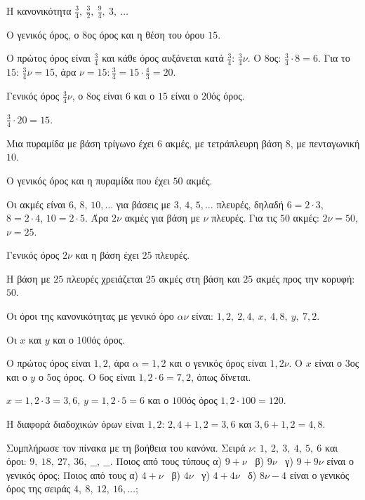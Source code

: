 \tixero Η κανονικότητα $\frac{3}{4},\ \frac{3}{2},\ \frac{9}{4},\ 3,\ \ldots$\par
\tithelo Ο γενικός όρος, ο $8$ος όρος και η θέση του όρου $15$.\par
\possindeo Ο πρώτος όρος είναι $\frac{3}{4}$ και κάθε όρος αυξάνεται κατά $\frac{3}{4}$: $\frac{3}{4}\nu$. Ο $8$ος: $\frac{3}{4}\cdot8=6$. Για το $15$: $\frac{3}{4}\nu=15$, άρα $\nu=15:\frac{3}{4}=15\cdot\frac{4}{3}=20$.\par
\apantisi Γενικός όρος $\frac{3}{4}\nu$, ο $8$ος είναι $6$ και ο $15$ είναι ο $20$ός όρος.\par
\elegxos $\frac{3}{4}\cdot20=15$.

\tixero Μια πυραμίδα με βάση τρίγωνο έχει $6$ ακμές, με τετράπλευρη βάση $8$, με πενταγωνική $10$.\par
\tithelo Ο γενικός όρος και η πυραμίδα που έχει $50$ ακμές.\par
\possindeo Οι ακμές είναι $6,\,8,\,10,\dots$ για βάσεις με $3,\,4,\,5,\dots$ πλευρές, δηλαδή $6=2\cdot3$, $8=2\cdot4$, $10=2\cdot5$. Άρα $2\nu$ ακμές για βάση με $\nu$ πλευρές. Για τις $50$ ακμές: $2\nu=50$, $\nu=25$.\par
\apantisi Γενικός όρος $2\nu$ και η βάση έχει $25$ πλευρές.\par
\elegxos Η βάση με $25$ πλευρές χρειάζεται $25$ ακμές στη βάση και $25$ ακμές προς την κορυφή: $50$.

\tixero Οι όροι της κανονικότητας με γενικό όρο $\alpha\nu$ είναι: $1{,}2,\ 2{,}4,\ x,\ 4{,}8,\ y,\ 7{,}2$.\par
\tithelo Οι $x$ και $y$ και ο $100$ός όρος.\par
\possindeo Ο πρώτος όρος είναι $1{,}2$, άρα $\alpha=1{,}2$ και ο γενικός όρος είναι $1{,}2\nu$. Ο $x$ είναι ο $3$ος και ο $y$ ο $5$ος όρος. Ο $6$ος είναι $1{,}2\cdot6=7{,}2$, όπως δίνεται.\par
\apantisi $x=1{,}2\cdot3=3{,}6$, $y=1{,}2\cdot5=6$ και ο $100$ός όρος $1{,}2\cdot100=120$.\par
\elegxos Η διαφορά διαδοχικών όρων είναι $1{,}2$: $2{,}4+1{,}2=3{,}6$ και $3{,}6+1{,}2=4{,}8$.



\ex Συμπλήρωσε τον πίνακα με τη βοήθεια του κανόνα. Σειρά $\nu$: $1,\ 2,\ 3,\ 4,\ 5,\ 6$ και όροι: $9,\ 18,\ 27,\ 36,\ \_\_,\ \_\_$. Ποιος από τους τύπους α) $9+\nu$ \ β) $9\nu$ \ γ) $9+9\nu$ είναι ο γενικός όρος; Ποιος από τους α) $4+\nu$ \ β) $4\nu$ \ γ) $4+4\nu$ \ δ) $8\nu-4$ είναι ο γενικός όρος της σειράς $4,\ 8,\ 12,\ 16,\dots$;

